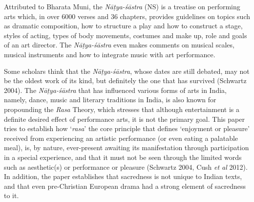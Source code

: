 Attributed to Bharata Muni, the \textsl{Nāṭya-śāstra} (NS) is a treatise on performing arts which, in over 6000 verses and 36 chapters, provides guidelines on topics such as dramatic composition, how to structure a play and how to construct a stage, styles of acting, types of body movements, costumes and make up, role and goals of an art director. The \textsl{Nāṭya-śāstra} even makes comments on musical scales, musical instruments and how to integrate music with art performance.

\newpage

Some scholars think that the \textsl{Nāṭya-śāstra}, whose dates are still debated, may not be the oldest work of its kind, but definitely the one that has survived (Schwartz 2004). The \textsl{Nāṭya-śāstra} that has influenced various forms of arts in India, namely, dance, music and literary traditions in India, is also known for propounding the \textsl{Rasa} Theory, which stresses that although entertainment is a definite desired effect of performance arts, it is not the primary goal. This paper tries to establish how ‘\textsl{rasa}' the core principle that defines ‘enjoyment or pleasure’ received from experiencing an artistic performance (or even eating a palatable meal), is, by nature, ever-present awaiting its manifestation through participation in a special experience, and that it must not be seen through the limited words such as aesthetic(s) or performance or pleasure (Schwartz 2004, Cush \textsl{et al} 2012). In addition, the paper establishes that sacredness is not unique to Indian texts, and that even pre-Christian European drama had a strong element of sacredness to it.

